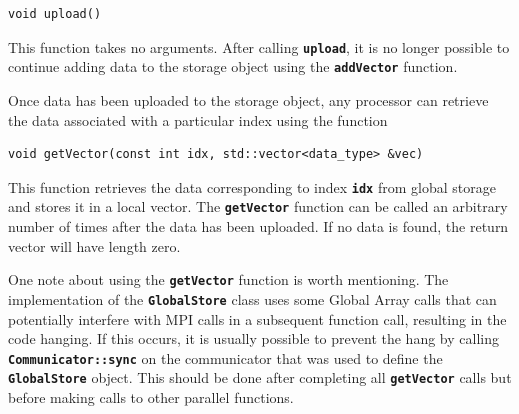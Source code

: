 {
\color{red}
\begin{Verbatim}[fontseries=b]
void upload()
\end{Verbatim}
}

This function takes no arguments. After calling \texttt{\textbf{upload}}, it is no longer possible to continue adding data to the storage object using the \texttt{\textbf{addVector}} function.

Once data has been uploaded to the storage object, any processor can retrieve the data associated with a particular index using the function

{
\color{red}
\begin{Verbatim}[fontseries=b]
void getVector(const int idx, std::vector<data_type> &vec)
\end{Verbatim}
}

This function retrieves the data corresponding to index \texttt{\textbf{idx}} from global storage and stores it in a local vector. The \texttt{\textbf{getVector}} function can be called an arbitrary number of times after the data has been uploaded. If no data is found, the return vector will have length zero.

One note about using the \texttt{\textbf{getVector}} function is worth mentioning. The implementation of the \texttt{\textbf{GlobalStore}} class uses some Global Array calls that can potentially interfere with MPI calls in a subsequent function call, resulting in the code hanging. If this occurs, it is usually possible to prevent the hang by calling \texttt{\textbf{Communicator::sync}} on the communicator that was used to define the \texttt{\textbf{GlobalStore}} object. This should be done after completing all \texttt{\textbf{getVector}} calls but before making calls to other parallel functions.
